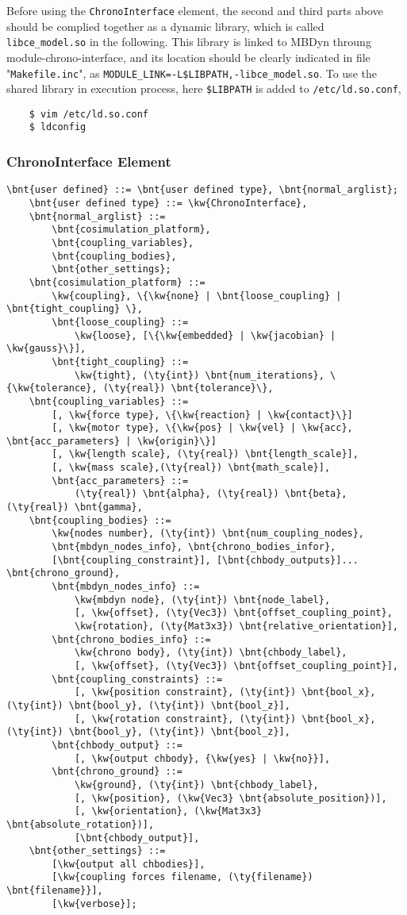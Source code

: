 Before using the {\texttt{ChronoInterface}} element, the second and third parts above should be complied together as a dynamic library, which is called {\texttt{libce\_model.so}} in the following. This library is linked to MBDyn throung module-chrono-interface, and its location should be clearly indicated in file "{\texttt{Makefile.inc}}",
as {\texttt{MODULE\_LINK=-L\$LIBPATH,-libce\_model.so}}.
To use the shared library in execution process, here {\texttt{\$LIBPATH}} is added to {\texttt{/etc/ld.so.conf}},
\begin{verbatim}
	$ vim /etc/ld.so.conf
	$ ldconfig
\end{verbatim}

\subsubsection{ChronoInterface Element}
\begin{Verbatim}[commandchars=\\\{\}]
	\bnt{user defined} ::= \bnt{user defined type}, \bnt{normal_arglist};
	\bnt{user defined type} ::= \kw{ChronoInterface},
	\bnt{normal_arglist} ::= 
		\bnt{cosimulation_platform}, 
		\bnt{coupling_variables}, 
		\bnt{coupling_bodies}, 
		\bnt{other_settings};
	\bnt{cosimulation_platform} ::= 
		\kw{coupling}, \{\kw{none} | \bnt{loose_coupling} | \bnt{tight_coupling} \}, 
		\bnt{loose_coupling} ::= 
			\kw{loose}, [\{\kw{embedded} | \kw{jacobian} | \kw{gauss}\}],
		\bnt{tight_coupling} ::= 
			\kw{tight}, (\ty{int}) \bnt{num_iterations}, \{\kw{tolerance}, (\ty{real}) \bnt{tolerance}\},
	\bnt{coupling_variables} ::= 
		[, \kw{force type}, \{\kw{reaction} | \kw{contact}\}]
		[, \kw{motor type}, \{\kw{pos} | \kw{vel} | \kw{acc}, \bnt{acc_parameters} | \kw{origin}\}]
		[, \kw{length scale}, (\ty{real}) \bnt{length_scale}],
		[, \kw{mass scale},(\ty{real}) \bnt{math_scale}],
		\bnt{acc_parameters} ::=
			(\ty{real}) \bnt{alpha}, (\ty{real}) \bnt{beta}, (\ty{real}) \bnt{gamma},
	\bnt{coupling_bodies} ::= 
		\kw{nodes number}, (\ty{int}) \bnt{num_coupling_nodes}, 
		\bnt{mbdyn_nodes_info}, \bnt{chrono_bodies_infor}, 
		[\bnt{coupling_constraint}], [\bnt{chbody_outputs}]... \bnt{chrono_ground},
		\bnt{mbdyn_nodes_info} ::= 
			\kw{mbdyn node}, (\ty{int}) \bnt{node_label}, 
			[, \kw{offset}, (\ty{Vec3}) \bnt{offset_coupling_point}, 
			\kw{rotation}, (\ty{Mat3x3}) \bnt{relative_orientation}],
		\bnt{chrono_bodies_info} ::= 
			\kw{chrono body}, (\ty{int}) \bnt{chbody_label},
			[, \kw{offset}, (\ty{Vec3}) \bnt{offset_coupling_point}],
		\bnt{coupling_constraints} ::= 
			[, \kw{position constraint}, (\ty{int}) \bnt{bool_x}, (\ty{int}) \bnt{bool_y}, (\ty{int}) \bnt{bool_z}],
			[, \kw{rotation constraint}, (\ty{int}) \bnt{bool_x}, (\ty{int}) \bnt{bool_y}, (\ty{int}) \bnt{bool_z}],
		\bnt{chbody_output} ::= 
			[, \kw{output chbody}, {\kw{yes} | \kw{no}}],
		\bnt{chrono_ground} ::= 
			\kw{ground}, (\ty{int}) \bnt{chbody_label}, 
			[, \kw{position}, (\kw{Vec3} \bnt{absolute_position})],
			[, \kw{orientation}, (\kw{Mat3x3} \bnt{absolute_rotation})],
			[\bnt{chbody_output}],
	\bnt{other_settings} ::= 
		[\kw{output all chbodies}], 
		[\kw{coupling forces filename, (\ty{filename}) \bnt{filename}}], 
		[\kw{verbose}];
\end{Verbatim}

